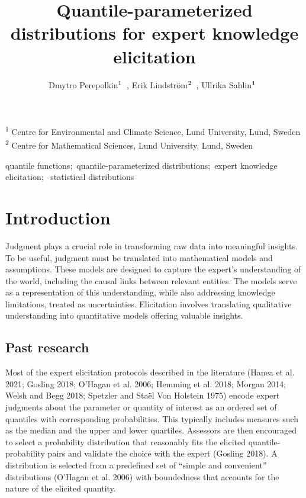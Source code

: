 \documentclass[
]{interact}
\title{Quantile-parameterized distributions for expert knowledge
elicitation}
\author{Dmytro
Perepolkin$\textsuperscript{1}$~\orcidlink{0000-0003-2402-304X}, Erik
Lindström$\textsuperscript{2}$~\orcidlink{0000-0002-6468-2624}, Ullrika
Sahlin$\textsuperscript{1}$~\orcidlink{0000-0002-2932-6253}}
\begin{document}
\captionsetup{labelsep=space}
\maketitle
\textsuperscript{1} Centre for Environmental and Climate Science, Lund
University, Lund, Sweden\\ \textsuperscript{2} Centre for Mathematical
Sciences, Lund University, Lund, Sweden
\begin{keywords}
\def\sep{;\ }
quantile functions\sep quantile-parameterized distributions\sep expert
knowledge elicitation\sep 
statistical distributions
\end{keywords}

\section{Introduction}\label{introduction}

Judgment plays a crucial role in transforming raw data into meaningful
insights. To be useful, judgment must be translated into mathematical
models and assumptions. These models are designed to capture the
expert's understanding of the world, including the causal links between
relevant entities. The models serve as a representation of this
understanding, while also addressing knowledge limitations, treated as
uncertainties. Elicitation involves translating qualitative
understanding into quantitative models offering valuable insights.

\subsection*{Past research}\label{past-research}

Most of the expert elicitation protocols described in the literature
(Hanea et al. 2021; Gosling 2018; O'Hagan et al. 2006; Hemming et al.
2018; Morgan 2014; Welsh and Begg 2018; Spetzler and Staël Von Holstein
1975) encode expert judgments about the parameter or quantity of
interest as an ordered set of quantiles with corresponding
probabilities. This typically includes measures such as the median and
the upper and lower quartiles. Assessors are then encouraged to select a
probability distribution that reasonably fits the elicited
quantile-probability pairs and validate the choice with the expert
(Gosling 2018). A distribution is selected from a predefined set of
``simple and convenient'' distributions (O'Hagan et al. 2006) with
boundedness that accounts for the nature of the elicited quantity.
\end{document}
